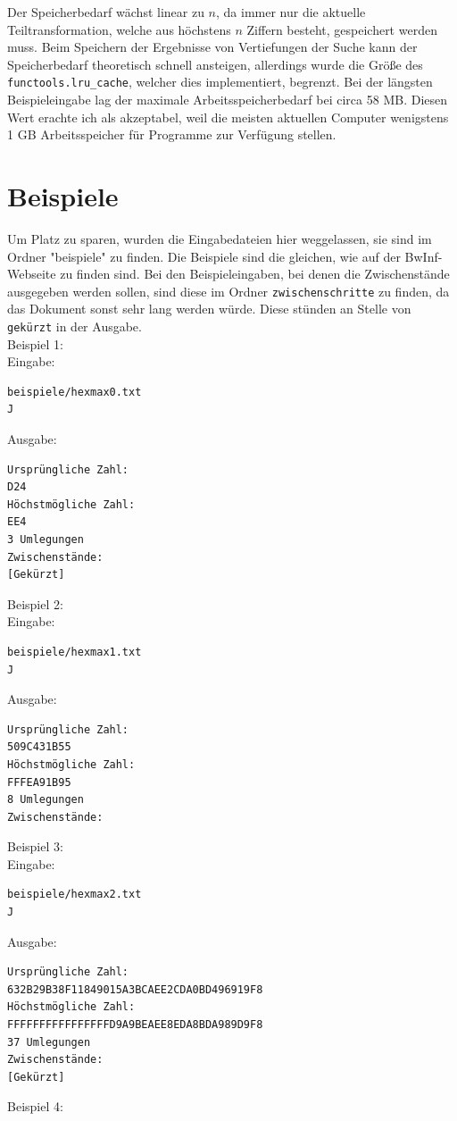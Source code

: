 \documentclass[a4paper,10pt,ngerman]{scrartcl}
\begin{document}
Der Speicherbedarf wächst linear zu $n$, da immer nur die aktuelle Teiltransformation, welche aus höchstens $n$ Ziffern besteht, gespeichert werden muss. Beim Speichern der Ergebnisse von Vertiefungen der Suche kann der Speicherbedarf theoretisch schnell ansteigen, allerdings wurde die Größe des \lstinline|functools.lru_cache|, welcher dies implementiert, begrenzt. Bei der längsten Beispieleingabe lag der maximale Arbeitsspeicherbedarf bei circa 58 MB. Diesen Wert erachte ich als akzeptabel, weil die meisten aktuellen Computer wenigstens 1 GB Arbeitsspeicher für Programme zur Verfügung stellen.
\section{Beispiele}
Um Platz zu sparen, wurden die Eingabedateien hier weggelassen, sie sind im Ordner "beispiele" zu finden. Die Beispiele sind die gleichen, wie auf der BwInf-Webseite zu finden sind. Bei den Beispieleingaben, bei denen die Zwischenstände ausgegeben werden sollen, sind diese im Ordner \lstinline|zwischenschritte| zu finden, da das Dokument sonst sehr lang werden würde. Diese stünden an Stelle von \lstinline|gekürzt| in der Ausgabe.\\
Beispiel 1: \\
Eingabe: \begin{lstlisting}
beispiele/hexmax0.txt
J
\end{lstlisting}
Ausgabe: \begin{lstlisting}
Ursprüngliche Zahl:
D24
Höchstmögliche Zahl:
EE4
3 Umlegungen
Zwischenstände:
[Gekürzt]
\end{lstlisting}
Beispiel 2: \\
Eingabe: \begin{lstlisting}
beispiele/hexmax1.txt
J
\end{lstlisting}
Ausgabe: \begin{lstlisting}
Ursprüngliche Zahl:
509C431B55
Höchstmögliche Zahl:
FFFEA91B95
8 Umlegungen
Zwischenstände:
\end{lstlisting}
Beispiel 3: \\
Eingabe: \begin{lstlisting}
beispiele/hexmax2.txt
J
\end{lstlisting}
Ausgabe: \begin{lstlisting}
Ursprüngliche Zahl:
632B29B38F11849015A3BCAEE2CDA0BD496919F8
Höchstmögliche Zahl:
FFFFFFFFFFFFFFFFD9A9BEAEE8EDA8BDA989D9F8
37 Umlegungen
Zwischenstände:
[Gekürzt]
\end{lstlisting}
Beispiel 4: \\
\end{document}
